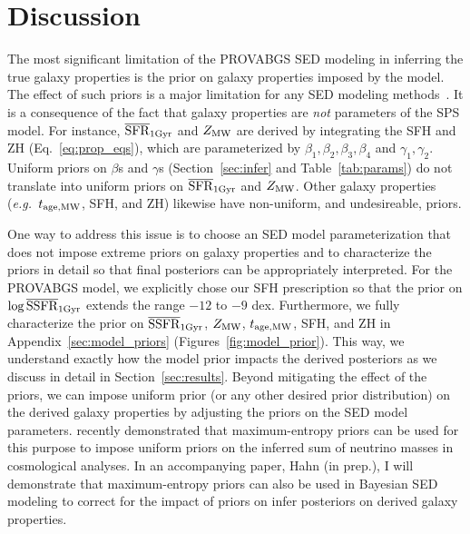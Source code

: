 \section{Discussion} \label{sec:discuss}
The most significant limitation of the {\sc PROVABGS} SED modeling in
inferring the true galaxy properties is the prior on galaxy properties imposed
by the model. 
The effect of such priors is  a major limitation for any SED modeling
methods~\citep[\emph{e.g.}][]{carnall2017, leja2019}. 
It is a consequence of the fact that galaxy properties are \emph{not}
parameters of the SPS model.
For instance, $\overline{\rm SFR}_{\rm 1Gyr}$ and $Z_{\rm MW}$ are derived by integrating the SFH and ZH
(Eq.~\ref{eq:prop_eqs}), which are parameterized by $\beta_1, \beta_2, \beta_3,
\beta_4$ and $\gamma_1, \gamma_2$. 
Uniform priors on $\beta$s and $\gamma$s (Section~\ref{sec:infer} and
Table~\ref{tab:params}) do not translate into uniform priors on $\overline{\rm SFR}_{\rm 1Gyr}$ and
$Z_{\rm MW}$.
Other galaxy properties (\emph{e.g.}~$t_{\rm age, MW}$, SFH, and ZH) likewise have
non-uniform, and undesireable, priors. 

One way to address this issue is to choose an SED model parameterization that
does not impose extreme priors on galaxy properties and to characterize the
priors in detail so that final posteriors can be appropriately interpreted. 
For the {\sc PROVABGS} model, we explicitly chose our SFH prescription so that
the prior on $\log\overline{\rm SSFR}_{\rm 1Gyr}$ extends the range $-12$ to $-9$ dex.
Furthermore, we fully characterize the prior on $\overline{\rm SSFR}_{\rm 1Gyr}$, $Z_{\rm MW}$, $t_{\rm age, MW}$,
SFH, and ZH in Appendix~\ref{sec:model_priors} (Figures~\ref{fig:model_prior}). 
This way, we understand exactly how the model prior impacts the derived
posteriors as we discuss in detail in Section~\ref{sec:results}. 
Beyond mitigating the effect of the priors, we can impose uniform prior (or any
other desired prior distribution) on the derived galaxy properties by adjusting
the priors on the SED model parameters. 
\cite{handley2019} recently demonstrated that maximum-entropy priors can be
used for this purpose to impose uniform priors on the inferred sum of neutrino
masses in cosmological analyses. 
In an accompanying paper, Hahn (in prep.), I will demonstrate that
maximum-entropy priors can also be used in Bayesian SED modeling to
correct for the impact of priors on infer posteriors on derived galaxy
properties. 


